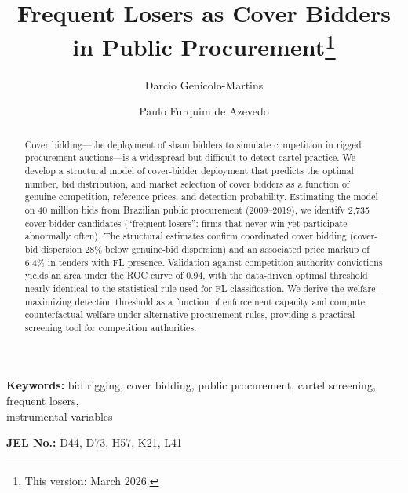 \begin{frontmatter}

\title{Frequent Losers as Cover Bidders in Public Procurement\texorpdfstring{\footnote{This version: March 2026.}}{}}

\author[insper]{Darcio Genicolo-Martins}
\author[insper]{Paulo Furquim de Azevedo}

\begin{abstract} %
Cover bidding---the deployment of sham bidders to simulate competition
in rigged procurement auctions---is a widespread but difficult-to-detect
cartel practice. We develop a structural model of cover-bidder deployment
that predicts the optimal number, bid distribution, and market selection
of cover bidders as a function of genuine competition, reference prices,
and detection probability. Estimating the model on 40 million bids from
Brazilian public procurement (2009--2019), we identify 2,735
cover-bidder candidates (``frequent losers'': firms that never win yet
participate abnormally often). The structural estimates confirm coordinated cover %
bidding (cover-bid dispersion 28\% below genuine-bid dispersion) and
an associated price markup of 6.4\% in tenders with FL presence.
Validation against competition authority convictions yields an area
under the ROC curve of 0.94, with the data-driven optimal threshold
nearly identical to the statistical rule used for FL classification.
We derive the welfare-maximizing detection threshold as a function of
enforcement capacity and compute counterfactual welfare under
alternative procurement rules, providing a practical screening tool
for competition authorities.
\end{abstract}

\end{frontmatter}

\noindent\textbf{Keywords:} bid rigging, cover bidding, public procurement, cartel screening, frequent losers,\\ instrumental variables

\noindent\textbf{JEL No.:} D44, D73, H57, K21, L41

\bigskip
